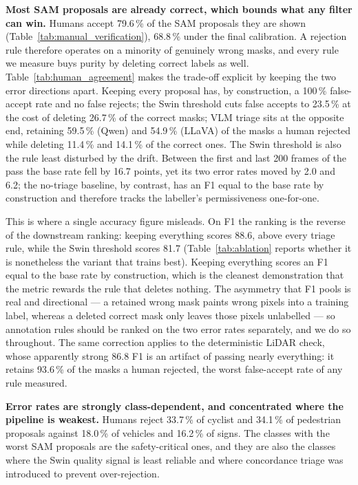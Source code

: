 \documentclass[conference]{IEEEtran}
\begin{document}
\textbf{Most SAM proposals are already correct, which bounds what any filter can win.}
Humans accept 79.6\,\% of the SAM proposals they are shown (Table~\ref{tab:manual_verification}),
68.8\,\% under the final calibration.
A rejection rule therefore operates on a minority of genuinely wrong masks, and every
rule we measure buys purity by deleting correct labels as well. Table~\ref{tab:human_agreement} makes
the trade-off explicit by keeping the two error directions apart. Keeping every proposal has, by
construction, a 100\,\% false-accept rate and no false rejects; the Swin threshold cuts false
accepts to 23.5\,\% at the cost of deleting 26.7\,\% of the correct masks; VLM triage
sits at the opposite end, retaining 59.5\,\% (Qwen) and 54.9\,\% (LLaVA) of the masks a
human rejected while deleting 11.4\,\% and 14.1\,\% of the correct ones.
The Swin threshold is also the rule least disturbed by the drift. Between the first and last 200 frames
of the pass the base rate fell by 16.7 points, yet its two error rates moved by 2.0 and 6.2; the
no-triage baseline, by contrast, has an F1 equal to the base rate by construction and therefore tracks
the labeller's permissiveness one-for-one.

This is where a single accuracy figure misleads. On F1 the ranking is the reverse of the downstream
ranking: keeping everything scores 88.6, above every triage rule, while the Swin threshold
scores 81.7 (Table~\ref{tab:ablation} reports whether it is nonetheless the variant that trains best).
Keeping everything scores an F1 equal to the base rate by construction, which is the cleanest
demonstration that the metric rewards the rule that deletes nothing.
The asymmetry that F1 pools is real and directional --- a retained wrong mask paints wrong pixels into
a training label, whereas a deleted correct mask only leaves those pixels unlabelled --- so annotation
rules should be ranked on the two error rates separately, and we do so throughout.
The same correction applies to the deterministic LiDAR check, whose apparently strong
86.8 F1 is an artifact of passing nearly everything: it retains 93.6\,\% of the masks a
human rejected, the worst false-accept rate of any rule measured.

\textbf{Error rates are strongly class-dependent, and concentrated where the pipeline is weakest.}
Humans reject 33.7\,\% of cyclist and 34.1\,\% of pedestrian proposals against
18.0\,\% of vehicles and 16.2\,\% of signs. The classes with the worst SAM proposals are
the safety-critical ones, and they are also the classes where the Swin quality signal is least reliable
and where concordance triage was introduced to prevent over-rejection.
\end{document}
